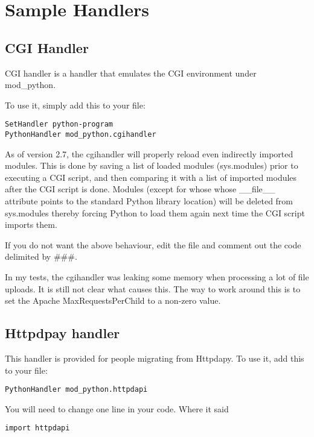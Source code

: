 \chapter{Sample Handlers\label{handlers}}

\section{CGI Handler\label{hand-cgi}}

CGI handler is a handler that emulates the CGI environment under mod_python. 

To use it, simply add this to your  file: 

\begin{verbatim}
SetHandler python-program
PythonHandler mod_python.cgihandler
\end{verbatim}

As of version 2.7, the cgihandler will properly reload even indirectly
imported modules. This is done by saving a list of loaded modules
(sys.modules) prior to executing a CGI script, and then comparing it
with a list of imported modules after the CGI script is done.  Modules
(except for whose whose __file__ attribute points to the standard
Python library location) will be deleted from sys.modules thereby
forcing Python to load them again next time the CGI script imports
them.

If you do not want the above behaviour, edit the 
file and comment out the code delimited by \#\#\#.

In my tests, the cgihandler was leaking some memory when processing a
lot of file uploads. It is still not clear what causes this. The way
to work around this is to set the Apache MaxRequestsPerChild to a
non-zero value.

\section{Httpdpay handler\label{hand-httpdapy}}

This handler is provided for people migrating from Httpdapy. To use
it, add this to your  file:

\begin{verbatim}
PythonHandler mod_python.httpdapi
\end{verbatim}

You will need to change one line in your code. Where it said

\begin{verbatim}
import httpdapi
\end{verbatim}

